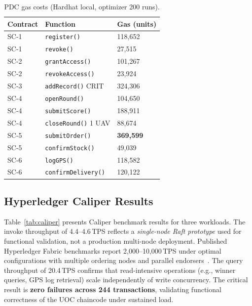 \documentclass[sigplan,screen]{acmart}
\newcommand{\pdc}{PDC\xspace}
\newcommand{\uoc}{UOC\xspace}
\begin{document}
\begin{table}[t]
\caption{\pdc gas costs (Hardhat local, optimizer 200 runs).}
\label{tab:gas}
\small
\begin{tabular}{@{}lll@{}}
\toprule
\textbf{Contract} & \textbf{Function} & \textbf{Gas (units)} \\
\midrule
SC-1 & \texttt{register()}       & 118,652 \\
SC-1 & \texttt{revoke()}         & 27,515  \\
SC-2 & \texttt{grantAccess()}    & 101,267 \\
SC-2 & \texttt{revokeAccess()}   & 23,924  \\
SC-3 & \texttt{addRecord()} CRIT & 324,306 \\
SC-4 & \texttt{openRound()}      & 104,650 \\
SC-4 & \texttt{submitScore()}    & 188,911 \\
SC-4 & \texttt{closeRound()} 1 UAV & 88,674 \\
SC-5 & \texttt{submitOrder()}    & \textbf{369,599} \\
SC-5 & \texttt{confirmStock()}   & 49,039  \\
SC-6 & \texttt{logGPS()}         & 118,582 \\
SC-6 & \texttt{confirmDelivery()} & 120,122 \\
\bottomrule
\end{tabular}
\end{table}

\subsection{Hyperledger Caliper Results}

Table~\ref{tab:caliper} presents Caliper benchmark results for three workloads.
The invoke throughput of 4.4--4.6\,TPS reflects a \emph{single-node Raft
prototype} used for functional validation, not a production multi-node
deployment.
Published Hyperledger Fabric benchmarks report 2,000--10,000\,TPS under
optimal configurations with multiple ordering nodes and parallel
endorsers~\cite{thakkar2018fabric}.
The query throughput of 20.4\,TPS confirms that read-intensive operations
(e.g., winner queries, GPS log retrieval) scale independently of write
concurrency.
The critical result is \textbf{zero failures across 244 transactions},
validating functional correctness of the \uoc chaincode under sustained load.
\end{document}
